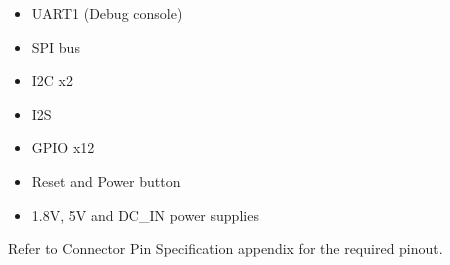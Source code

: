 \documentclass[a4paper,10pt,oneside,english]{sphinxmanual}
\begin{document}
\begin{description}
\begin{itemize}
\item {} 
\sphinxAtStartPar
UART1              (Debug console)

\item {} 
\sphinxAtStartPar
SPI bus

\item {} 
\sphinxAtStartPar
I2C x2

\item {} 
\sphinxAtStartPar
I2S

\item {} 
\sphinxAtStartPar
GPIO x12

\item {} 
\sphinxAtStartPar
Reset and Power button

\item {} 
\sphinxAtStartPar
1.8V, 5V and DC\_IN power supplies

\end{itemize}

\sphinxAtStartPar
Refer to Connector Pin Specification appendix for the required pinout.

\end{description}

\sphinxAtStartPar
{}
\end{document}
